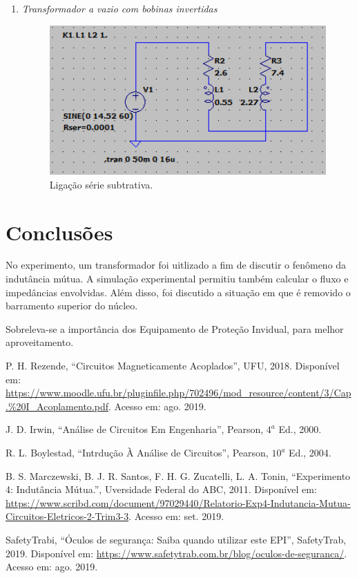 \documentclass[a4paper,12pt,oneside,openany,table,xcdraw]{article}
\begin{document}
\begin{enumerate}
\item \emph{Transformador a vazio com bobinas invertidas}\\
\begin{figure}[H]
\centering
\captionsetup{font=scriptsize}
\includegraphics[width=11cm]{sim1}
\caption{Ligação série subtrativa.}
\label{aditiva}
\end{figure}

\end{enumerate}

\section{Conclusões} %
No experimento, um transformador foi uitlizado a fim de discutir o fenômeno da indutância mútua. A simulação experimental permitiu também calcular o fluxo e impedâncias envolvidas. Além disso, foi discutido a situação em que é removido o barramento superior do núcleo. 

Sobreleva-se a importância dos Equipamento de Proteção Invidual, para melhor aproveitamento.

\newpage
\begin{thebibliography}{9} 
    P. H. Rezende,
    “Circuitos Magneticamente Acoplados”, UFU, 2018.
 Disponível em:
 \url{https://www.moodle.ufu.br/pluginfile.php/702496/mod_resource/content/3/Cap.\%20I_Acoplamento.pdf}. Acesso em: ago. 2019.

    J. D. Irwin,
    “Análise de Circuitos Em Engenharia”, Pearson, $4^a$ Ed., 2000.

    R. L. Boylestad,
    “Intrdução À Análise de Circuitos”, Pearson, $10^a$ Ed., 2004.

    B. S. Marczewski, B. J. R. Santos, F. H. G. Zucatelli, L. A. Tonin,
    “Experimento 4: Indutância Mútua.”, Uversidade Federal do ABC, 2011.
 Disponível em:
 \url{https://www.scribd.com/document/97029440/Relatorio-Exp4-Indutancia-Mutua-Circuitos-Eletricos-2-Trim3-3}. Acesso em: set. 2019.

    SafetyTrabi,
    “Óculos de segurança: Saiba quando utilizar este EPI”, SafetyTrab, 2019.
 Disponível em:
 \url{https://www.safetytrab.com.br/blog/oculos-de-seguranca/}. Acesso em: ago. 2019.


\end{thebibliography}
\end{document}
